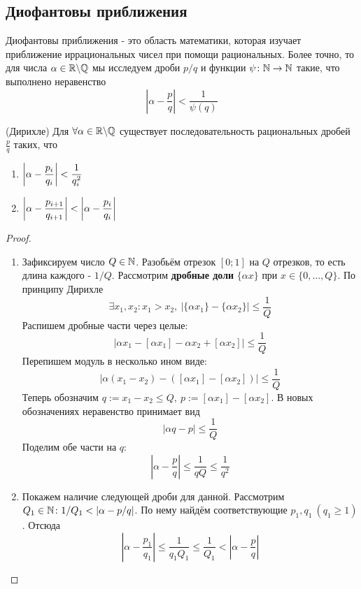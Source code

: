 \subsection{Диофантовы приближения}

Диофантовы приближения - это область математики, которая изучает приближение иррациональных чисел при помощи рациональных. Более точно, то для числа $\alpha \in \mathbb{R} \backslash \mathbb{Q}$ мы исследуем дроби $p/q$ и функции $\psi \colon \mathbb{N} \to \mathbb{N}$ такие, что выполнено неравенство
\[
	\left|\alpha - \frac{p}{q}\right| < \frac{1}{\psi(q)}
\]

\begin{theorem} (Дирихле)
	Для $\forall \alpha \in \mathbb{R} \backslash \mathbb{Q}$ существует последовательность рациональных дробей $\frac{p}{q}$ таких, что
	\begin{enumerate}
		\item \(\displaystyle \left|\alpha - \frac{p_i}{q_i}\right| < \frac{1}{q_i^2}\)
		
		\item \(\displaystyle \left|\alpha - \frac{p_{i + 1}}{q_{i + 1}}\right| < \left|\alpha - \frac{p_i}{q_i}\right|\)
	\end{enumerate}
\end{theorem}

\begin{proof}~
	\begin{enumerate}
		\item Зафиксируем число $Q \in \mathbb{N}$. Разобьём отрезок $[0; 1]$ на $Q$ отрезков, то есть длина каждого - $1 / Q$. Рассмотрим \textbf{дробные доли} $\{\alpha x\}$ при $x \in \{0, \ldots, Q\}$. По принципу Дирихле
		\[
			\exists x_1, x_2 \colon x_1 > x_2,\ |\{\alpha x_1\} - \{\alpha x_2\}| \le \frac{1}{Q}
		\]
		Распишем дробные части через целые:
		\[
			|\alpha x_1 - [\alpha x_1] - \alpha x_2 + [\alpha x_2]| \le \frac{1}{Q}
		\]
		Перепишем модуль в несколько ином виде:
		\[
			|\alpha(x_1 - x_2) - ([\alpha x_1] - [\alpha x_2])| \le \frac{1}{Q}
		\]
		Теперь обозначим $q := x_1 - x_2 \le Q,\ p := [\alpha x_1] - [\alpha x_2]$. В новых обозначениях неравенство принимает вид
		\[
			|\alpha q - p| \le \frac{1}{Q}
		\]
		Поделим обе части на $q$:
		\[
			\left|\alpha - \frac{p}{q}\right| \le \frac{1}{qQ} \le \frac{1}{q^2}
		\]
		
		\item Покажем наличие следующей дроби для данной. Рассмотрим $Q_1 \in \mathbb{N} \colon 1/Q_1 < |\alpha - p/q|$. По нему найдём соответствующие $p_1, q_1\ (q_1 \ge 1)$. Отсюда
		\[
			\left|\alpha - \frac{p_1}{q_1}\right| \le \frac{1}{q_1Q_1} \le \frac{1}{Q_1} < \left|\alpha - \frac{p}{q}\right|
		\]
	\end{enumerate}
\end{proof}

